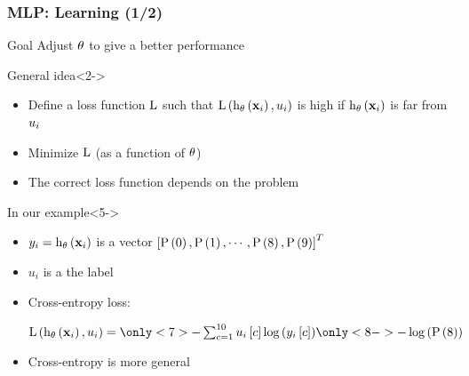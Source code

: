 \begin{frame}
  \frametitle{\acl{MLP}: Learning (1/2)}

  \begin{block}{Goal}
    Adjust $\mathbf{\theta}$ to give a better performance
  \end{block}

  \begin{block}{General idea}<2->
    \begin{itemize}
    \item<2-> Define a loss function $\mathrm{L}$ such that $\mathrm{L} \left ( {
            \mathrm{h}_{\mathbf{\theta}} \left ( {\mathbf{x}_i} \right ),
            u_i
          } \right )$ is high if $\mathrm{h}_{\mathbf{\theta}} \left ( {\mathbf{x}_i} \right )$ is far from
          $u_i$
     \item<3-> Minimize $\mathrm{L}$ (as a function of $\mathbf{\theta}$)
     \item<4-> The correct loss function depends on the problem
    \end{itemize}
  \end{block}

  \begin{block}{In our example}<5->
    \begin{itemize}
    \item $y_i = \mathrm{h}_{\mathbf{\theta}} \left ( {\mathbf{x}_i} \right )$ is a vector $\left [ {\mathrm{P} \left ( {0} \right ), \mathrm{P} \left ( {1} \right ), \cdots,
        \mathrm{P} \left ( {8} \right ), \mathrm{P} \left ( {9} \right )} \right ]^T$
    \item $u_i$ is a the label 
  \item<7-> Cross-entropy loss:
    \begin{center}
      $
        \apply{\lossFunc}{\apply{\hyp_\params}{\example_i},
          \knownLabel_i} = \only<7>{- \sum_{c=1}^{10} \vectorElem{u_i}{c}
          \apply{\log}{\vectorElem{\predLabel_i}{c}}}
                           \only<8->{- \apply{\log}{\prob{8}}}
      $
    \end{center}
    \item<9-> Cross-entropy is more general
    \end{itemize}
  \end{block}
\end{frame}


